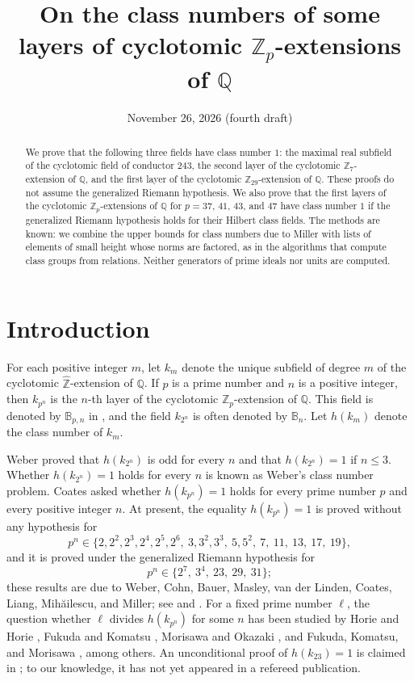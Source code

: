 \documentclass[11pt]{amsart}
\title[Class numbers of some layers of cyclotomic $\mathbb{Z}_p$-extensions]{On the class numbers of some layers of cyclotomic $\mathbb{Z}_p$-extensions of $\mathbb{Q}$}
\date{November 26, 2026 (fourth draft)}
\theoremstyle{plain}
\theoremstyle{definition}
\begin{document}
\begin{abstract}
We prove that the following three fields have class number $1$: the maximal real subfield of the cyclotomic field of conductor $243$, the second layer of the cyclotomic $\mathbb{Z}_7$-extension of $\mathbb{Q}$, and the first layer of the cyclotomic $\mathbb{Z}_{29}$-extension of $\mathbb{Q}$.
These proofs do not assume the generalized Riemann hypothesis.
We also prove that the first layers of the cyclotomic $\mathbb{Z}_p$-extensions of $\mathbb{Q}$ for $p = 37$, $41$, $43$, and $47$ have class number $1$ if the generalized Riemann hypothesis holds for their Hilbert class fields.
The methods are known: we combine the upper bounds for class numbers due to Miller with lists of elements of small height whose norms are factored, as in the algorithms that compute class groups from relations.
Neither generators of prime ideals nor units are computed.
\end{abstract}

\maketitle

\section{Introduction}

For each positive integer $m$, let $k_m$ denote the unique subfield of degree $m$ of the cyclotomic $\hat{\mathbb{Z}}$-extension of $\mathbb{Q}$.
If $p$ is a prime number and $n$ is a positive integer, then $k_{p^n}$ is the $n$-th layer of the cyclotomic $\mathbb{Z}_p$-extension of $\mathbb{Q}$.
This field is denoted by $\mathbb{B}_{p,n}$ in \cite{Mi15b}, and the field $k_{2^n}$ is often denoted by $\mathbb{B}_n$.
Let $h(k_m)$ denote the class number of $k_m$.

Weber \cite{We86} proved that $h(k_{2^n})$ is odd for every $n$ and that $h(k_{2^n}) = 1$ if $n \le 3$.
Whether $h(k_{2^n}) = 1$ holds for every $n$ is known as Weber's class number problem.
Coates \cite{Co12} asked whether $h(k_{p^n}) = 1$ holds for every prime number $p$ and every positive integer $n$.
At present, the equality $h(k_{p^n}) = 1$ is proved without any hypothesis for
\[
p^n \in \{2, 2^2, 2^3, 2^4, 2^5, 2^6,\ 3, 3^2, 3^3,\ 5, 5^2,\ 7,\ 11,\ 13,\ 17,\ 19\},
\]
and it is proved under the generalized Riemann hypothesis for
\[
p^n \in \{2^7,\ 3^4,\ 23,\ 29,\ 31\};
\]
these results are due to Weber, Cohn, Bauer, Masley, van der Linden, Coates, Liang, Mih\u{a}ilescu, and Miller; see \cite[Table 1, Theorem 7, and Table 2]{Mi15b} and \cite{Co60, Ba69, Ma78, vdL82, Co12, Mi14, Mi14b}.
For a fixed prime number $\ell$, the question whether $\ell$ divides $h(k_{p^n})$ for some $n$ has been studied by Horie and Horie \cite{HH09}, Fukuda and Komatsu \cite{FK11}, Morisawa and Okazaki \cite{MO13}, and Fukuda, Komatsu, and Morisawa \cite{FKM14}, among others.
An unconditional proof of $h(k_{23}) = 1$ is claimed in \cite{Ch26}; to our knowledge, it has not yet appeared in a refereed publication.
\end{document}
